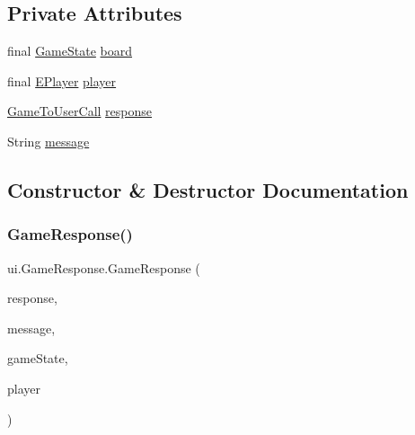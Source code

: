 \subsection*{Private Attributes}
\begin{DoxyCompactItemize}
\item 
final \mbox{\hyperlink{classgame_1_1game_state_1_1_game_state}{Game\+State}} \mbox{\hyperlink{classui_1_1_game_response_aa72a7178bc0dff99cd0a3e3f28690bfb}{board}}
\item 
final \mbox{\hyperlink{enumgame_1_1_e_player}{E\+Player}} \mbox{\hyperlink{classui_1_1_game_response_a7d3c9f3496ce9af6691634acd2740a42}{player}}
\item 
\mbox{\hyperlink{enumui_1_1commands_1_1_game_to_user_call}{Game\+To\+User\+Call}} \mbox{\hyperlink{classui_1_1_game_response_a20ad6da79064a1f7060e3b77fcc2c4d1}{response}}
\item 
String \mbox{\hyperlink{classui_1_1_game_response_ab844834f62cc4fd08f2ad42e78ec09ac}{message}}
\end{DoxyCompactItemize}


\subsection{Constructor \& Destructor Documentation}
\mbox{\label{classui_1_1_game_response_a6ce5a25d490ee98b2fbfa4abe1dc8333}} 
\subsubsection{\texorpdfstring{Game\+Response()}{GameResponse()}}
{\footnotesize\ttfamily ui.\+Game\+Response.\+Game\+Response (\begin{DoxyParamCaption}\item[{\mbox{\hyperlink{enumui_1_1commands_1_1_game_to_user_call}{Game\+To\+User\+Call}}}]{response,  }\item[{String}]{message,  }\item[{\mbox{\hyperlink{classgame_1_1game_state_1_1_game_state}{Game\+State}}}]{game\+State,  }\item[{\mbox{\hyperlink{enumgame_1_1_e_player}{E\+Player}}}]{player }\end{DoxyParamCaption})\hspace{0.3cm}{\ttfamily [inline]}}



